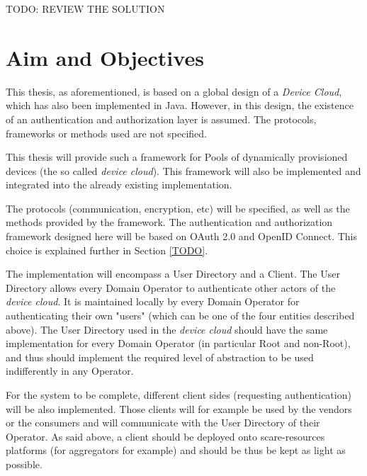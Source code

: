 { \huge TODO: REVIEW THE SOLUTION }
\\





\section{Aim and Objectives}
This thesis, as aforementioned, is based on a global design of a \emph{Device Cloud}, which has also been implemented in Java. However, in this design, the existence of an authentication and authorization layer is assumed. The protocols, frameworks or methods used are not specified.

This thesis will provide such a framework for Pools of dynamically provisioned devices (the so called \emph{device cloud}). This framework will also be implemented and integrated into the already existing implementation.

The protocols (communication, encryption, etc) will be specified, as well as the methods provided by the framework. The authentication and authorization framework designed here will be based on OAuth 2.0 and OpenID Connect. This choice is explained further in Section \ref{TODO}. 

The implementation will encompass a User Directory and a Client. The User Directory allows every Domain Operator to authenticate other actors of the \emph{device cloud}. It is maintained locally by every Domain Operator for authenticating their own "users" (which can be one of the four entities described above). The User Directory used in the \emph{device cloud} should have the same implementation for every Domain Operator (in particular Root and non-Root), and thus should implement the required level of abstraction to be used indifferently in any Operator.

For the system to be complete, different client sides (requesting authentication) will be also implemented. Those clients will for example be used by the vendors or the consumers and will communicate with the User Directory of their Operator. As said above, a client should be deployed onto scare-resources platforms (for aggregators for example) and should be thus be kept as light as possible.

